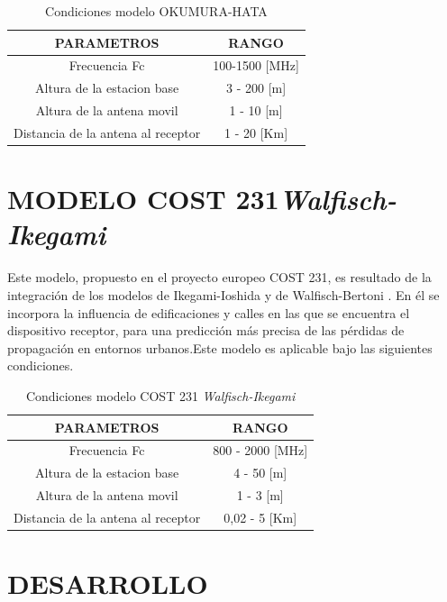 \documentclass[conference, 9pt, a4paper]{IEEEtran}
\begin{document}
\begin{table}
\centering
\begin{tabular}{|c|c|}\hline  %
	PARAMETROS							& RANGO	\\ \hline   %
	Frecuencia Fc						& 100-1500 [MHz] \\ \hline 
	Altura de la estacion base			& 3 - 200  [m] \\ \hline 
	Altura de la antena movil			& 1 - 10   [m] \\ \hline
	Distancia de la antena al receptor  & 1 - 20   [Km] \\ \hline
\end{tabular}
\caption{Condiciones modelo OKUMURA-HATA}
\end{table}





\section{MODELO COST 231\textit{Walfisch-Ikegami}}
Este modelo, propuesto en el proyecto europeo COST 231, es resultado de la integración de los modelos de Ikegami-Ioshida y de Walfisch-Bertoni . En él se incorpora la influencia de edificaciones y calles en las que se encuentra el dispositivo receptor, para una predicción más precisa de las pérdidas de propagación en entornos urbanos.Este modelo es aplicable bajo las siguientes condiciones.\\
\begin{table}
	\centering
	\begin{tabular}{|c|c|}\hline
		PARAMETROS							& RANGO \\ \hline
		Frecuencia Fc						&  800 - 2000 [MHz] \\ \hline
		Altura de la estacion base			& 4 - 50   [m] \\ \hline 
		Altura de la antena movil			& 1 - 3    [m] \\ \hline
		Distancia de la antena al receptor	& 0,02 - 5 [Km] \\ \hline
	\end{tabular}
	\caption{Condiciones modelo COST 231 \textit{Walfisch-Ikegami}}
\end{table}


\section{DESARROLLO}
\end{document}

